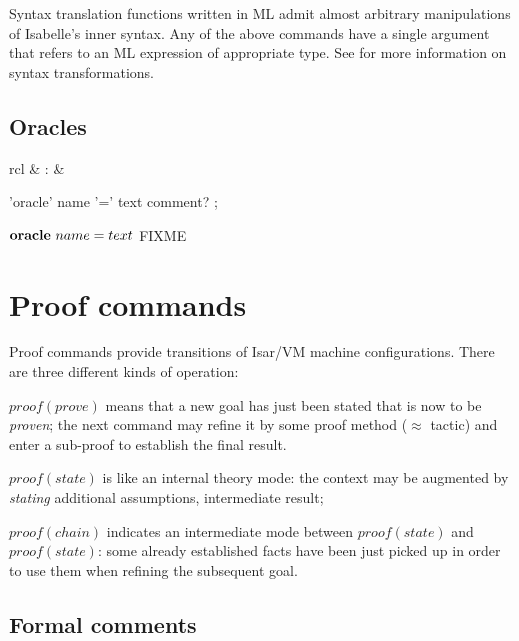 Syntax translation functions written in ML admit almost arbitrary
manipulations of Isabelle's inner syntax.  Any of the above commands have a
single  argument that refers to an ML expression of
appropriate type.  See \cite[\S8]{isabelle-ref} for more information on syntax
transformations.


\subsection{Oracles}

\begin{matharray}{rcl}
   & : &  \\
\end{matharray}

\begin{rail}
  'oracle' name '=' text comment?
  ;
\end{rail}

\begin{descr}
\item [${\mathord{\mathbf{oracle}}}~name=text$] FIXME
\end{descr}


\section{Proof commands}

Proof commands provide transitions of Isar/VM machine configurations.  There
are three different kinds of operation:
\begin{descr}
\item [$proof(prove)$] means that a new goal has just been stated that is now
  to be \emph{proven}; the next command may refine it by some proof method
  ($\approx$ tactic) and enter a sub-proof to establish the final result.
\item [$proof(state)$] is like an internal theory mode: the context may be
  augmented by \emph{stating} additional assumptions, intermediate result;
\item [$proof(chain)$] indicates an intermediate mode between $proof(state)$
  and $proof(state)$: some already established facts have been just picked up
  in order to use them when refining the subsequent goal.
\end{descr}


\subsection{Formal comments}\label{sec:formal-cmt-prf}

